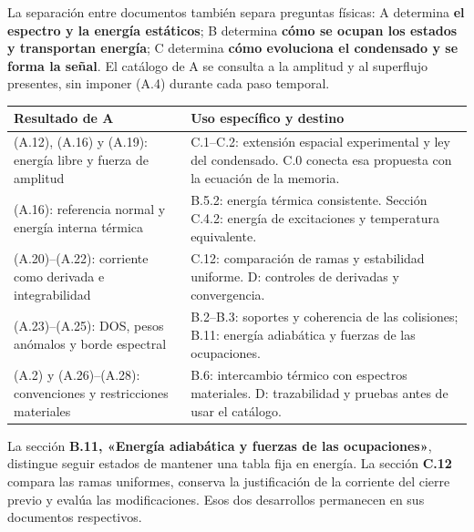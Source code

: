 \documentclass[
  spanish,
  10pt,
  a4paper,
]{article}
\newcounter{none} %
\begin{document}
La separación entre documentos también separa preguntas físicas: A
determina \textbf{el espectro y la energía estáticos}; B determina
\textbf{cómo se ocupan los estados y transportan energía}; C determina
\textbf{cómo evoluciona el condensado y se forma la señal}. El catálogo
de A se consulta a la amplitud y al superflujo presentes, sin imponer
(A.4) durante cada paso temporal.

{\def\LTcaptype{none} %
\begin{longtable}[]{@{}
  >{\raggedright\arraybackslash}p{}
  >{\raggedright\arraybackslash}p{}@{}}
\toprule\noalign{}
\begin{minipage}[b]{\linewidth}\raggedright
Resultado de A
\end{minipage} & \begin{minipage}[b]{\linewidth}\raggedright
Uso específico y destino
\end{minipage} \\
\midrule\noalign{}
\endhead
\bottomrule\noalign{}
\endlastfoot
(A.12), (A.16) y (A.19): energía libre y fuerza de amplitud & C.1--C.2:
extensión espacial experimental y ley del condensado. C.0 conecta esa
propuesta con la ecuación de la memoria. \\
(A.16): referencia normal y energía interna térmica & B.5.2: energía
térmica consistente. Sección C.4.2: energía de excitaciones y
temperatura equivalente. \\
(A.20)--(A.22): corriente como derivada e integrabilidad & C.12:
comparación de ramas y estabilidad uniforme. D: controles de derivadas y
convergencia. \\
(A.23)--(A.25): DOS, pesos anómalos y borde espectral & B.2--B.3:
soportes y coherencia de las colisiones; B.11: energía adiabática y
fuerzas de las ocupaciones. \\
(A.2) y (A.26)--(A.28): convenciones y restricciones materiales & B.6:
intercambio térmico con espectros materiales. D: trazabilidad y pruebas
antes de usar el catálogo. \\
\end{longtable}
}

La sección \textbf{B.11, «Energía adiabática y fuerzas de las
ocupaciones»}, distingue seguir estados de mantener una tabla fija en
energía. La sección \textbf{C.12} compara las ramas uniformes, conserva
la justificación de la corriente del cierre previo y evalúa las
modificaciones. Esos dos desarrollos permanecen en sus documentos
respectivos.
\end{document}
